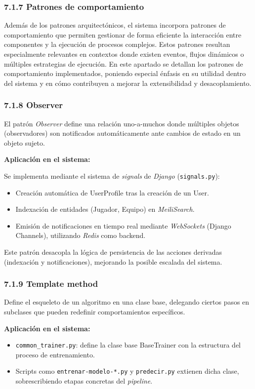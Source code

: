 \subsubsection{7.1.7 Patrones de comportamiento}
Además de los patrones arquitectónicos, el sistema incorpora patrones de
comportamiento que permiten gestionar de forma eficiente la interacción entre
componentes y la ejecución de procesos complejos. Estos patrones resultan
especialmente relevantes en contextos donde existen eventos, flujos dinámicos o
múltiples estrategias de ejecución.
En este apartado se detallan los patrones de comportamiento implementados,
poniendo especial énfasis en su utilidad dentro del sistema y en cómo
contribuyen a mejorar la extensibilidad y desacoplamiento.
 
\subsubsection{7.1.8 Observer}
 
El patrón \textit{Observer} define una relación uno-a-muchos donde múltiples objetos
(observadores) son notificados automáticamente ante cambios de estado en un
objeto sujeto.
 
\textbf{Aplicación en el sistema:}
 
Se implementa mediante el sistema de \textit{signals} de \textit{Django} (\texttt{signals.py}):
\begin{itemize}
\item Creación automática de UserProfile tras la creación de un User.
\item Indexación de entidades (Jugador, Equipo) en \textit{MeiliSearch}.
\item Emisión de notificaciones en tiempo real mediante \textit{WebSockets} (Django
Channels), utilizando \textit{Redis} como backend.
\end{itemize}
 
Este patrón desacopla la lógica de persistencia de las acciones derivadas
(indexación y notificaciones), mejorando la posible escalada del sistema.
 
\subsubsection{7.1.9 Template method}
 
Define el esqueleto de un algoritmo en una clase base, delegando ciertos pasos
en subclases que pueden redefinir comportamientos específicos.
 
\textbf{Aplicación en el sistema:}
\begin{itemize}
\item \texttt{common\_trainer.py}: define la clase base BaseTrainer con la
estructura del proceso de entrenamiento.
\item Scripts como \texttt{entrenar-modelo-*.py} y \texttt{predecir.py}
extienen dicha clase, sobrescribiendo etapas concretas del \textit{pipeline}.
\end{itemize}
 
